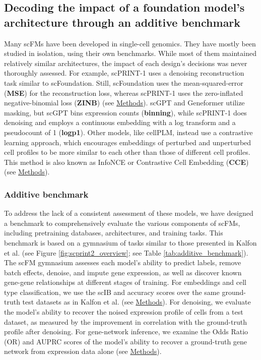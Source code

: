\subsection{Decoding the impact of a foundation model's architecture
through an additive
benchmark}\label{decoding-the-impact-of-a-foundation-models-architecture-through-an-additive-benchmark}

Many \gls{scFM}s have been developed in single-cell genomics. They have mostly
been studied in isolation, using their own benchmarks. While most of
them maintained relatively similar architectures, the impact of each
design's decisions was never thoroughly assessed. For example, scPRINT-1
uses a denoising reconstruction task similar to scFoundation. Still,
scFoundation uses the mean-squared-error (\textbf{MSE}) for the
reconstruction loss, whereas scPRINT-1 uses the zero-inflated
negative-binomial loss (\textbf{\gls{ZINB}}) (see
\hyperref[zinbmse-loss]{Methods}). scGPT and Geneformer utilize
masking, but scGPT bins expression counts (\textbf{binning}), while
scPRINT-1 does denoising and employs a continuous embedding with a log
transform and a pseudocount of 1 (\textbf{logp1})\citep{cuiScGPTBuildingFoundation2024,theodorisTransferLearningEnables2023}.
Other models, like cellPLM, instead use a contrastive learning approach,
which encourages embeddings of perturbed and unperturbed cell profiles
to be more similar to each other than those of different cell
profiles. This method is also known as InfoNCE or
Contrastive Cell Embedding (\textbf{CCE}) (see
\hyperref[embedding-contrastive-loss]{Methods})\citep{oordRepresentationLearningContrastive2019}.

\subsubsection{Additive benchmark}\label{additive-benchmark}

To address the lack of a consistent assessment of these models, we have
designed a benchmark to comprehensively evaluate the various components
of \gls{scFM}s, including pretraining databases, architectures, and training
tasks. This benchmark is based on a gymnasium of tasks similar to those
presented in Kalfon et al.\citep{scprint} (see Figure \ref{fig:scprint2_overview}; see Table
\ref{tab:additive_benchmark}). The \gls{scFM} gymnasium assesses each model's ability to predict labels,
remove batch effects, denoise, and impute gene expression, as well as
discover known gene-gene relationships at different stages of training.
For embeddings and cell type classification, we use the \gls{scIB} and
accuracy scores over the same ground-truth test datasets as in Kalfon et
al. (see \hyperref[additive-benchmarks-datasets]{Methods}). For
denoising, we evaluate the model's ability to recover the noised
expression profile of cells from a test dataset, as measured by the
improvement in correlation with the ground-truth profile after
denoising. For gene-network inference, we examine the Odds Ratio (OR)
and \gls{AUPRC} scores of the model's ability to recover a ground-truth gene
network from expression data alone (see
\hyperref[gene-network-metrics]{Methods}).

